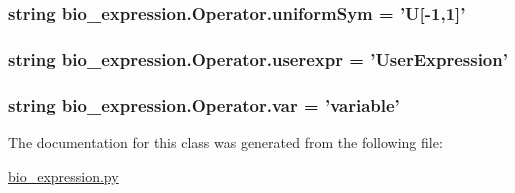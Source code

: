 \hypertarget{classbio__expression_1_1_operator_af0fdc1f7125448dd8f87c775b4e92bc0}{
\subsubsection[{uniform\+Sym}]{\setlength{\rightskip}{0pt plus 5cm}string bio\+\_\+expression.\+Operator.\+uniform\+Sym = 'U\mbox{[}-\/1,1\mbox{]}'\hspace{0.3cm}{\ttfamily [static]}}}\label{classbio__expression_1_1_operator_af0fdc1f7125448dd8f87c775b4e92bc0}
\hypertarget{classbio__expression_1_1_operator_a36db50b667d12009b2416d75f867e812}{
\subsubsection[{userexpr}]{\setlength{\rightskip}{0pt plus 5cm}string bio\+\_\+expression.\+Operator.\+userexpr = 'User\+Expression'\hspace{0.3cm}{\ttfamily [static]}}}\label{classbio__expression_1_1_operator_a36db50b667d12009b2416d75f867e812}
\hypertarget{classbio__expression_1_1_operator_a57e66dc86a1f2dc1b445de72cb6b5ae3}{
\subsubsection[{var}]{\setlength{\rightskip}{0pt plus 5cm}string bio\+\_\+expression.\+Operator.\+var = 'variable'\hspace{0.3cm}{\ttfamily [static]}}}\label{classbio__expression_1_1_operator_a57e66dc86a1f2dc1b445de72cb6b5ae3}


The documentation for this class was generated from the following file\+:\begin{DoxyCompactItemize}
\item 
\hyperlink{bio__expression_8py}{bio\+\_\+expression.\+py}\end{DoxyCompactItemize}
